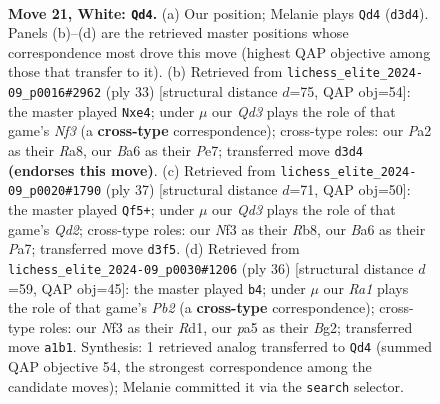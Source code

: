 \documentclass[11pt]{article}
\begin{document}
\begin{figure}[p]
\label{fig:thought-m38}
\end{figure}

\clearpage

\begin{figure}[p]\centering
\begin{subfigure}{0.46\textwidth}\centering
\resizebox{\linewidth}{!}{%
\newchessgame
\chessboard[
  setfen={rr1qb1k1/p4ppp/B4n2/p2p4/7P/1P1Q1NP1/P4P2/R3R1K1 w - - 2 21},
  showmover=false,
  pgfstyle=straightmove, color=movearrow, markmove={d3-d4}
]}
\caption{}
\end{subfigure}\hfill
\begin{subfigure}{0.46\textwidth}\centering
\resizebox{\linewidth}{!}{%
\newchessgame
\chessboard[
  setfen={r3k2r/pp2ppb1/3p1np1/8/3NP1qp/1PN1B3/P1PQ3P/R4R1K b kq - 1 17},
  showmover=false,
  pgfstyle=straightmove, color=movearrow, markmove={f6-e4}
]}
\caption{}
\end{subfigure}
\\[4pt]
\begin{subfigure}{0.46\textwidth}\centering
\resizebox{\linewidth}{!}{%
\newchessgame
\chessboard[
  setfen={1rr3k1/p2q1pbp/5np1/3P4/3B4/2N2P1P/PP1Q2P1/1K1R3R b - - 0 19},
  showmover=false,
  pgfstyle=straightmove, color=movearrow, markmove={d7-f5}
]}
\caption{}
\end{subfigure}\hfill
\begin{subfigure}{0.46\textwidth}\centering
\resizebox{\linewidth}{!}{%
\newchessgame
\chessboard[
  setfen={3rr1k1/pp3ppp/1qn5/7b/3p4/P4NPP/1P1QPPB1/2RR2K1 w - - 1 19},
  showmover=false,
  pgfstyle=straightmove, color=movearrow, markmove={b2-b4}
]}
\caption{}
\end{subfigure}
\caption{\textbf{Move 21, White: \texttt{Qd4}.} (a) Our position; Melanie plays \texttt{Qd4} (\texttt{d3d4}). Panels (b)--(d) are the retrieved master positions whose correspondence most drove this move (highest QAP objective among those that transfer to it). (b) Retrieved from \texttt{lichess\_elite\_2024-09\_p0016\#2962} (ply 33) [structural distance $d$=75, QAP obj=54]: the master played \texttt{Nxe4}; under $\mu$ our \emph{Qd3} plays the role of that game's \emph{Nf3} (a \textbf{cross-type} correspondence); cross-type roles: our \emph{P}a2 as their \emph{R}a8, our \emph{B}a6 as their \emph{P}e7; transferred move \texttt{d3d4} \textbf{(endorses this move)}. (c) Retrieved from \texttt{lichess\_elite\_2024-09\_p0020\#1790} (ply 37) [structural distance $d$=71, QAP obj=50]: the master played \texttt{Qf5+}; under $\mu$ our \emph{Qd3} plays the role of that game's \emph{Qd2}; cross-type roles: our \emph{N}f3 as their \emph{R}b8, our \emph{B}a6 as their \emph{P}a7; transferred move \texttt{d3f5}. (d) Retrieved from \texttt{lichess\_elite\_2024-09\_p0030\#1206} (ply 36) [structural distance $d$=59, QAP obj=45]: the master played \texttt{b4}; under $\mu$ our \emph{Ra1} plays the role of that game's \emph{Pb2} (a \textbf{cross-type} correspondence); cross-type roles: our \emph{N}f3 as their \emph{R}d1, our \emph{p}a5 as their \emph{B}g2; transferred move \texttt{a1b1}. Synthesis: 1 retrieved analog transferred to \texttt{Qd4} (summed QAP objective 54, the strongest correspondence among the candidate moves); Melanie committed it via the \texttt{search} selector.}

\end{figure}
\end{document}
